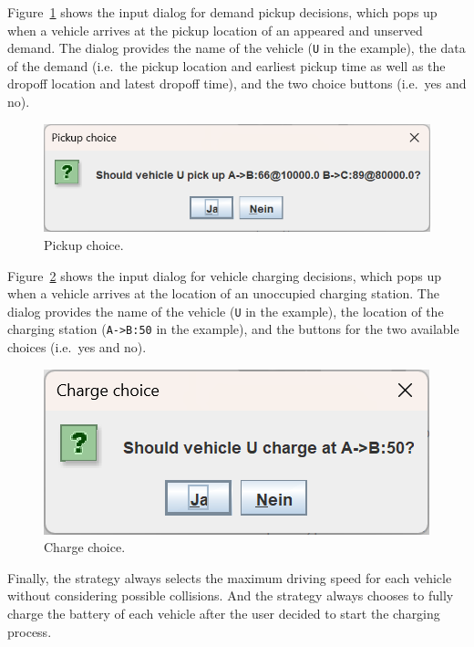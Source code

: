 \documentclass[a4paper,twoside]{article}
\begin{document}
	Figure~\ref{fig:manual-controller-demand} shows the input dialog for demand pickup decisions, which pops up when a vehicle arrives at the pickup location of an appeared and unserved demand.
	The dialog provides the name of the vehicle (\texttt{U} in the example), the data of the demand (i.e.\ the pickup location and earliest pickup time as well as the dropoff location and latest dropoff time), and the two choice buttons (i.e.\ yes and no).
	
	\begin{figure}[!ht]
		\centering
		\includegraphics[scale=0.4]{../../screenshots/manual-controller-demand.png}
		\caption{Pickup choice.}
		\label{fig:manual-controller-demand}
	\end{figure}
	
	Figure~\ref{fig:manual-controller-charge} shows the input dialog for vehicle charging decisions, which pops up when a vehicle arrives at the location of an unoccupied charging station.
	The dialog provides the name of the vehicle (\texttt{U} in the example), the location of the charging station (\texttt{A->B:50} in the example), and the buttons for the two available choices (i.e.\ yes and no).
	
	\begin{figure}[!ht]
		\centering
		\includegraphics[scale=0.4]{../../screenshots/manual-controller-charge.png}
		\caption{Charge choice.}
		\label{fig:manual-controller-charge}
	\end{figure}
	
	Finally, the strategy always selects the maximum driving speed for each vehicle without considering possible collisions.
	And the strategy always chooses to fully charge the battery of each vehicle after the user decided to start the charging process.
	
\end{document}
